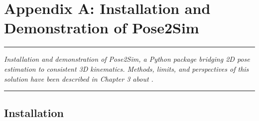 
\appendix
\renewcommand\chaptername{Appendix~}

\lhead[\fancyplain{}{\leftmark}]%
      {\fancyplain{}{}} %
\chead[\fancyplain{}{}]%
      {\fancyplain{}{}}
\rhead[\fancyplain{}{}]%
      {\fancyplain{}{\rightmark}}%
\lfoot[\fancyplain{}{}]%
      {\fancyplain{}{}}
\cfoot[\fancyplain{}{\thepage}]%
      {\fancyplain{}{\thepage}} %
\rfoot[\fancyplain{}{}]%
     {\fancyplain{}{\scriptsize}}



\chapter{Appendix A: Installation and Demonstration of Pose2Sim}
\label{Ann:0}


\begin{center}
	\rule{0.7\linewidth}{.5pt}
	\begin{minipage}{0.7\linewidth}
	\smallskip
	
	\textit{
	Installation and demonstration of Pose2Sim, a Python package bridging 2D pose estimation to consistent 3D kinematics. Methods, limits, and perspectives of this solution have been described in Chapter 3 about .
	}
	
	\end{minipage}
	\smallskip
	\rule{0.7\linewidth}{.5pt}
	\end{center}
	
	\minitoc
	\newpage


\section{Installation}

